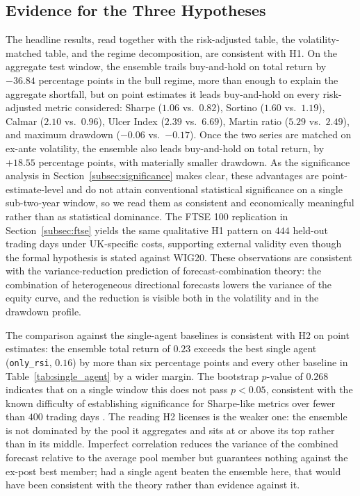 \documentclass{ieeeaccess}
\newcommand{\TRtest}{\ensuremath{0.23}}
\newcommand{\Shtest}{\ensuremath{1.06}}
\newcommand{\MDDtest}{\ensuremath{-0.06}}
\newcommand{\Calmtest}{\ensuremath{2.10}}
\newcommand{\BHsharpe}{\ensuremath{0.82}}
\newcommand{\MDDbh}{\ensuremath{-0.17}}
\newcommand{\Calmbh}{\ensuremath{0.96}}
\newcommand{\BestSingleName}{\texttt{only\_rsi}}
\newcommand{\BestSingleTR}{\ensuremath{0.16}}
\newcommand{\PvsBestSingle}{\ensuremath{0.268}}
\newcommand{\EnsSortino}{\ensuremath{1.60}}
\newcommand{\BHSortino}{\ensuremath{1.19}}
\newcommand{\EnsUlcer}{\ensuremath{2.39}}
\newcommand{\BHUlcer}{\ensuremath{6.69}}
\newcommand{\EnsMartin}{\ensuremath{5.29}}
\newcommand{\BHMartin}{\ensuremath{2.49}}
\newcommand{\VolScaledExcessPP}{\ensuremath{+18.55}}
\newcommand{\BullShortfallPP}{\ensuremath{-36.84}}
\newcommand{\FtseOOSDays}{\ensuremath{444}}
\begin{document}
\subsection{Evidence for the Three Hypotheses}

The headline results, read together with the risk-adjusted table, the volatility-matched table, and the regime decomposition, are consistent with H1. On the aggregate test window, the ensemble trails buy-and-hold on total return by $\BullShortfallPP{}$ percentage points in the bull regime, more than enough to explain the aggregate shortfall, but on point estimates it leads buy-and-hold on every risk-adjusted metric considered: Sharpe ($\Shtest{}$ vs.\ $\BHsharpe{}$), Sortino ($\EnsSortino{}$ vs.\ $\BHSortino{}$), Calmar ($\Calmtest{}$ vs.\ $\Calmbh{}$), Ulcer Index ($\EnsUlcer{}$ vs.\ $\BHUlcer{}$), Martin ratio ($\EnsMartin{}$ vs.\ $\BHMartin{}$), and maximum drawdown ($\MDDtest{}$ vs.\ $\MDDbh{}$). Once the two series are matched on ex-ante volatility, the ensemble also leads buy-and-hold on total return, by $\VolScaledExcessPP{}$ percentage points, with materially smaller drawdown. As the significance analysis in Section~\ref{subsec:significance} makes clear, these advantages are point-estimate-level and do not attain conventional statistical significance on a single sub-two-year window, so we read them as consistent and economically meaningful rather than as statistical dominance. The FTSE 100 replication in Section~\ref{subsec:ftse} yields the same qualitative H1 pattern on \FtseOOSDays{} held-out trading days under UK-specific costs, supporting external validity even though the formal hypothesis is stated against WIG20. These observations are consistent with the variance-reduction prediction of forecast-combination theory: the combination of heterogeneous directional forecasts lowers the variance of the equity curve, and the reduction is visible both in the volatility and in the drawdown profile.

The comparison against the single-agent baselines is consistent with H2 on point estimates: the ensemble total return of $\TRtest$ exceeds the best single agent (\BestSingleName{}, $\BestSingleTR$) by more than six percentage points and every other baseline in Table~\ref{tab:single_agent} by a wider margin. The bootstrap $p$-value of $\PvsBestSingle$ indicates that on a single window this does not pass $p < 0.05$, consistent with the known difficulty of establishing significance for Sharpe-like metrics over fewer than $400$ trading days \cite{bailey2014}. The reading H2 licenses is the weaker one: the ensemble is not dominated by the pool it aggregates and sits at or above its top rather than in its middle. Imperfect correlation reduces the variance of the combined forecast relative to the average pool member but guarantees nothing against the ex-post best member; had a single agent beaten the ensemble here, that would have been consistent with the theory rather than evidence against it.
\end{document}
